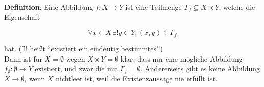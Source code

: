 \documentclass{article}
\begin{document}
\textbf{Definition}: Eine Abbildung $f \colon X \to Y$ ist eine Teilmenge $\Gamma_f \subseteq X \times Y$,
welche die Eigenschaft

\[
  \forall x \in X \hspace{2pt} \exists! y \in Y \colon (x, y) \in \Gamma_f
\]

hat. ($\exists!$ heißt ``existiert ein eindeutig bestimmtes'') \\

Dann ist für $X = \emptyset$ wegen $X \times Y = \emptyset$ klar, dass nur eine mögliche Abbildung
$f_\emptyset \colon \emptyset \to Y$ existiert, und zwar die mit $\Gamma_f = \emptyset$. Andererseits
gibt es keine Abbildung $X \to \emptyset$, wenn $X$ nichtleer ist, weil die Existenzaussage nie
erfüllt ist.
\end{document}
